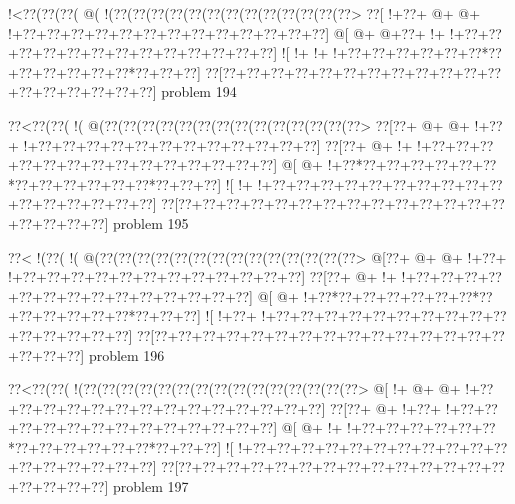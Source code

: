 \vbox{\vbox{\goo
\- !<\0??(\0??(\0??(\- @(\- !(\0??(\0??(\0??(\0??(\0??(\0??(\0??(\0??(\0??(\0??(\0??(\0??(\0??>
\0??[\- !+\0??+\- @+\- @+\- !+\0??+\0??+\0??+\0??+\0??+\0??+\0??+\0??+\0??+\0??+\0??+\0??+\0??]
\- @[\- @+\- @+\0??+\- !+\- !+\0??+\0??+\0??+\0??+\0??+\0??+\0??+\0??+\0??+\0??+\0??+\0??+\0??]
\- ![\- !+\- !+\- !+\0??+\0??+\0??+\0??+\0??+\0??*\0??+\0??+\0??+\0??+\0??+\0??*\0??+\0??+\0??]
\0??[\0??+\0??+\0??+\0??+\0??+\0??+\0??+\0??+\0??+\0??+\0??+\0??+\0??+\0??+\0??+\0??+\0??+\0??]
}
\hfil problem 194\hfil\break
}



\vbox{\vbox{\goo
\0??<\0??(\0??(\- !(\- @(\0??(\0??(\0??(\0??(\0??(\0??(\0??(\0??(\0??(\0??(\0??(\0??(\0??(\0??>
\0??[\0??+\- @+\- @+\- !+\0??+\- !+\0??+\0??+\0??+\0??+\0??+\0??+\0??+\0??+\0??+\0??+\0??+\0??]
\0??[\0??+\- @+\- !+\- !+\0??+\0??+\0??+\0??+\0??+\0??+\0??+\0??+\0??+\0??+\0??+\0??+\0??+\0??]
\- @[\- @+\- !+\0??*\0??+\0??+\0??+\0??+\0??+\0??*\0??+\0??+\0??+\0??+\0??+\0??*\0??+\0??+\0??]
\- ![\- !+\- !+\0??+\0??+\0??+\0??+\0??+\0??+\0??+\0??+\0??+\0??+\0??+\0??+\0??+\0??+\0??+\0??]
\0??[\0??+\0??+\0??+\0??+\0??+\0??+\0??+\0??+\0??+\0??+\0??+\0??+\0??+\0??+\0??+\0??+\0??+\0??]
}
\hfil problem 195\hfil\break
}



\vbox{\vbox{\goo
\0??<\- !(\0??(\- !(\- @(\0??(\0??(\0??(\0??(\0??(\0??(\0??(\0??(\0??(\0??(\0??(\0??(\0??(\0??>
\- @[\0??+\- @+\- @+\- !+\0??+\- !+\0??+\0??+\0??+\0??+\0??+\0??+\0??+\0??+\0??+\0??+\0??+\0??]
\0??[\0??+\- @+\- !+\- !+\0??+\0??+\0??+\0??+\0??+\0??+\0??+\0??+\0??+\0??+\0??+\0??+\0??+\0??]
\- @[\- @+\- !+\0??*\0??+\0??+\0??+\0??+\0??+\0??*\0??+\0??+\0??+\0??+\0??+\0??*\0??+\0??+\0??]
\- ![\- !+\0??+\- !+\0??+\0??+\0??+\0??+\0??+\0??+\0??+\0??+\0??+\0??+\0??+\0??+\0??+\0??+\0??]
\0??[\0??+\0??+\0??+\0??+\0??+\0??+\0??+\0??+\0??+\0??+\0??+\0??+\0??+\0??+\0??+\0??+\0??+\0??]
}
\hfil problem 196\hfil\break
}



\vbox{\vbox{\goo
\0??<\0??(\0??(\- !(\0??(\0??(\0??(\0??(\0??(\0??(\0??(\0??(\0??(\0??(\0??(\0??(\0??(\0??(\0??>
\- @[\- !+\- @+\- @+\- !+\0??+\0??+\0??+\0??+\0??+\0??+\0??+\0??+\0??+\0??+\0??+\0??+\0??+\0??]
\0??[\0??+\- @+\- !+\0??+\- !+\0??+\0??+\0??+\0??+\0??+\0??+\0??+\0??+\0??+\0??+\0??+\0??+\0??]
\- @[\- @+\- !+\- !+\0??+\0??+\0??+\0??+\0??+\0??*\0??+\0??+\0??+\0??+\0??+\0??*\0??+\0??+\0??]
\- ![\- !+\0??+\0??+\0??+\0??+\0??+\0??+\0??+\0??+\0??+\0??+\0??+\0??+\0??+\0??+\0??+\0??+\0??]
\0??[\0??+\0??+\0??+\0??+\0??+\0??+\0??+\0??+\0??+\0??+\0??+\0??+\0??+\0??+\0??+\0??+\0??+\0??]
}
\hfil problem 197\hfil\break
}




